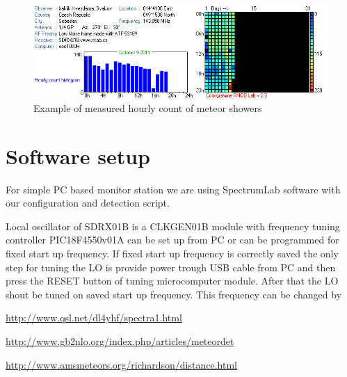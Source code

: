 \documentclass[12pt,a4paper,oneside]{article}
\begin{document}
\begin{figure}[htbp]
\begin{center}
\includegraphics [width=150mm] {./img/colorgram.png} 
\end{center}
\caption{Example of measured hourly count of meteor showers}   
\end{figure}

\section{Software setup}

For simple PC based monitor station we are using SpectrumLab software with   our configuration and detection script. 

Local oscillator of SDRX01B is a CLKGEN01B module with frequency tuning controller  PIC18F4550v01A can be set up from PC or can be programmed for fixed start up frequency. If fixed start up frequency is correctly saved the only step for tuning the LO is provide power trough USB cable from PC and then press the RESET button of tuning microcomputer module. After that the LO shout be tuned on saved start up frequency. This frequency can be changed by   

\begin{thebibliography}{99}
\href{http://www.qsl.net/dl4yhf/spectra1.html}{http://www.qsl.net/dl4yhf/spectra1.html}

\href{http://www.gb2nlo.org/index.php/articles/meteordet}{http://www.gb2nlo.org/index.php/articles/meteordet}

\href{http://www.amsmeteors.org/richardson/distance.html}{http://www.amsmeteors.org/richardson/distance.html}




\end{thebibliography}
\end{document}
